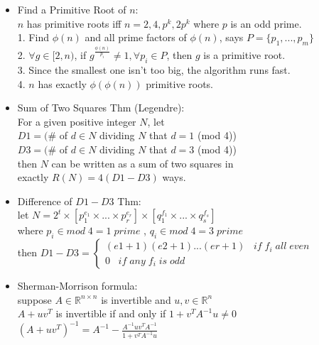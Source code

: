\begin{itemize}[leftmargin=*]
\item Find a Primitive Root of $n$:\\
  $n$ has primitive roots iff $n=2,4,p^k,2p^k$ where $p$ is an odd prime.\\
  1. Find $\phi(n)$ and all prime factors of $\phi(n)$, says $P=\{p_1,...,p_m\}$\\
  2. $\forall g\in[2,n)$, if $g^{\frac{\phi(n)}{p_i}}\ne 1,\forall p_i\in P$, then $g$ is a primitive root.\\
  3. Since the smallest one isn't too big, the algorithm runs fast.\\
  4. $n$ has exactly $\phi(\phi(n))$ primitive roots.
\item Sum of Two Squares Thm (Legendre):\\
  For a given positive integer $N$, let\\
  $D1 = (\#$ of $d \in N$ dividing $N$ that $d=1$ (mod 4))\\
  $D3 = (\#$ of $d \in N$ dividing $N$ that $d=3$ (mod 4))\\
  then $N$ can be written as a sum of two squares in\\
  exactly $R(N) = 4(D1-D3)$ ways.
\item Difference of $D1-D3$ Thm:\\
  let $N=2^t \times [p_1^{e_1} \times ...\times p_r^{e_r}] \times [q_1^{f_1} \times ...\times q_s^{f_s}]$\\
  where $p_i \in mod\;4 = 1\;prime$ , $q_i \in mod\;4 = 3\;prime$\\
  then $D1 - D3 = \begin{cases}(e1+1)(e2+1)...(er+1)\;\;\;if\;f_i\;all\;even\\0\;\;\;if\;any\;f_i\;is\;odd\end{cases}$
\item Sherman-Morrison formula:\\
  suppose $A \in \mathbb{R}^{n\times n}$ is invertible and $u,v \in \mathbb{R}^n$\\
  $A + uv^T$ is invertible if and only if $1 + v^TA^{-1}u \ne 0$\\
  $(A + uv^T)^{-1} = A^{-1} - \frac{A^{-1}uv^TA^{-1}}{1+v^TA^{-1}u}$\\
\end{itemize}
